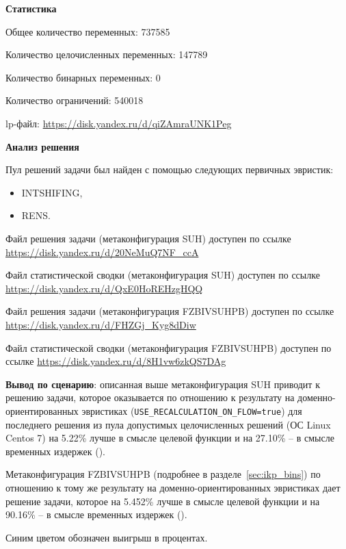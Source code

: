 \documentclass[%
	11pt,
	a4paper,
	utf8,
		]{article}
\begin{document}
\textbf{Статистика}\vspace*{1mm}

Общее количество переменных: 737585

Количество целочисленных переменных: 147789

Количество бинарных переменных: 0

Количество ограничений: 540018

lp-файл: \url{https://disk.yandex.ru/d/qiZAmraUNK1Peg}

\vspace*{5mm}\textbf{Анализ решения}\vspace*{1mm}

Пул решений задачи был найден с помощью следующих первичных эвристик:
\begin{itemize}
	\item INTSHIFING,
	
	\item RENS.
\end{itemize}

Файл решения задачи (метаконфигурация SUH) доступен по ссылке \url{https://disk.yandex.ru/d/20NeMuQ7NF_ccA}

Файл статистической сводки (метаконфигурация SUH) доступен по ссылке \url{https://disk.yandex.ru/d/QxE0HoREHzgHQQ}

Файл решения задачи (метаконфигурация FZBIVSUHPB) доступен по ссылке \url{https://disk.yandex.ru/d/FHZGj_Kyg8dDiw}

Файл статистической сводки (метаконфигурация FZBIVSUHPB) доступен по ссылке \url{https://disk.yandex.ru/d/8H1vw6zkQS7DAg}

\vspace*{3mm}
\textbf{Вывод по сценарию}: описанная выше метаконфигурация SUH приводит к решению задачи, которое оказывается по отношению к результату на доменно-ориентированных эвристиках (\verb|USE_RECALCULATION_ON_FLOW=true|) для последнего решения из пула допустимых целочисленных решений (ОС Linux Centos 7) на 5.22\% лучше в смысле целевой функции и на 27.10\% -- в смысле временных издержек ().

Метаконфигурация FZBIVSUHPB (подробнее в разделе~\ref{sec:ikp_bins}) по отношению к тому же результату на доменно-ориентированных эвристиках дает решение задачи, которое на 5.452\% лучше в смысле целевой функции и на 90.16\% -- в смысле временных издержек ().

Синим цветом обозначен выигрыш в процентах.
\end{document}
